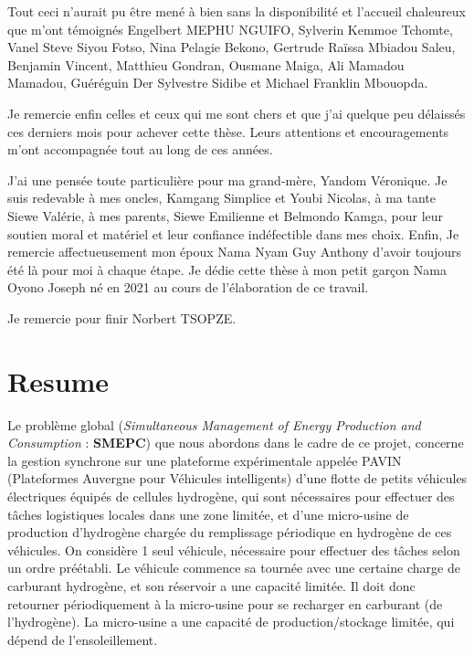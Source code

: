 \documentclass[11pt,a4paper]{report}
\begin{document}
{Tout ceci n'aurait pu être mené à bien sans la disponibilité et l'accueil chaleureux que m'ont témoignés Engelbert MEPHU NGUIFO, Sylverin Kemmoe Tchomte, Vanel Steve Siyou Fotso, Nina Pelagie Bekono, Gertrude Raïssa Mbiadou Saleu, Benjamin Vincent, Matthieu Gondran, Ousmane Maiga, Ali Mamadou Mamadou, Guéréguin Der Sylvestre Sidibe et Michael Franklin Mbouopda.

Je remercie enfin celles et ceux qui me sont chers et que j'ai quelque peu délaissés ces derniers mois pour achever cette thèse. Leurs attentions et encouragements m'ont accompagnée tout au long de ces années.

J'ai une pensée toute particulière pour ma grand-mère, Yandom Véronique. Je suis redevable à mes oncles, Kamgang Simplice et Youbi Nicolas, à ma tante Siewe Valérie, à mes parents, Siewe Emilienne et Belmondo Kamga, pour leur soutien moral et matériel et leur confiance indéfectible dans mes choix. Enfin, Je remercie affectueusement mon époux Nama Nyam Guy Anthony d'avoir toujours été là pour moi à chaque étape. Je dédie cette thèse à mon petit garçon Nama Oyono Joseph né en 2021 au cours de l'élaboration de ce travail.

Je remercie pour finir Norbert TSOPZE.
}
\newpage
\chapter*{Resume}
Le problème global (\textit{Simultaneous Management of Energy Production and Consumption} : \textbf{SMEPC}) que
nous abordons dans le cadre de ce projet, concerne la gestion synchrone sur une plateforme
expérimentale appelée PAVIN (Plateformes Auvergne pour Véhicules intelligents) d'une flotte de petits
véhicules électriques équipés de cellules hydrogène, qui sont nécessaires pour effectuer des tâches logistiques
locales dans une zone limitée, et d'une micro-usine de production d'hydrogène chargée du remplissage
périodique en hydrogène de ces véhicules.
 On considère 1 seul véhicule, nécessaire pour effectuer des tâches selon un ordre
préétabli. Le véhicule commence sa tournée avec une certaine charge de carburant hydrogène, et son réservoir a
une capacité limitée. Il doit donc retourner périodiquement à la micro-usine pour se recharger en
carburant (de l'hydrogène). La micro-usine a une capacité de production/stockage limitée, qui dépend de l'ensoleillement.
\end{document}
